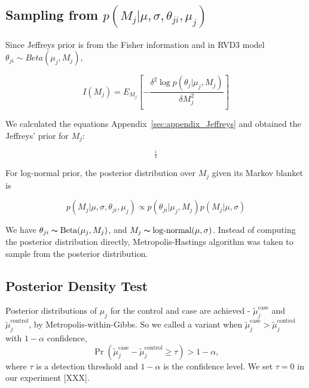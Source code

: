 \documentclass[11pt,reqno]{amsart}
\begin{document}
\subsection{Sampling from $p \left( M_{j} |\mu,\sigma, \theta_{ji},\mu_j\right)$}
Since Jeffreys prior is from the Fisher information and in RVD3 model ${\theta }_{ji}\sim Beta\left( {\mu }_{j},{M}_{j}\right)$,

\begin{equation}\label{equ:JefferyInference}
I\left({M}_{j}\right)={E}_{{M}_{j}}\left[ -\frac{\delta ^{2}\log p\left(\theta _{j}|\mu_{j},M_{j}\right)}{\delta M^{2}_{j}}\right]
\end{equation}

We calculated the equations Appendix~\ref{sec:appendix_Jeffreys} and obtained the Jeffreys' prior for $M_j$:

\begin{equation}
[-\left(\Psi_{1}(M_{j}) - \Psi_{1}(\mu_{j} M_{j})\mu_{j}^{2} - \Psi_{1}((1-\mu_{j})M_{j}){(1-\mu_{j})^{2}}\right)]^{\frac{1}{2}}
\end{equation}

For log-normal prior, the posterior distribution over $M_{j}$ given its Markov blanket is

\begin{equation}
	p( M_{j} |\mu, \sigma, \theta_{ji},\mu_j) \propto p(\theta_{ji} | \mu_j, M_j) p(M_{j} | \mu, \sigma)
\end{equation}

We have $ \theta_{ji}\thicksim\text{Beta}(\mu_{j},M_{j})$, and $ M_{j} \thicksim \text{log-normal}(\mu, \sigma)$.
Instead of computing the posterior distribution directly, Metropolis-Hastings algorithm was taken to sample from the posterior distribution.

\subsection{Posterior Density Test}\label{sec:hypothesis_test}
Posterior distributions of $\mu_j$ for the control and case are achieved -  $\tilde{\mu}_j^{\text{case}}$ and $\tilde{\mu}_j^{\text{control}}$, by Metropolis-within-Gibbs.
So we called a variant when $\tilde{\mu}_j^{\text{case}} > \tilde{\mu}_j^{\text{control}}$ with $1-\alpha$ confidence,
\begin{equation}\label{eqn:bayes_test}
	\Pr( \tilde{\mu}_j^{\text{case}} - \tilde{\mu}_j^{\text{control}} \geq \tau ) > 1-\alpha,
\end{equation}
where $\tau$ is a detection threshold and $1-\alpha$ is the confidence level. We set $\tau = 0$ in our experiment [XXX].
\end{document}
